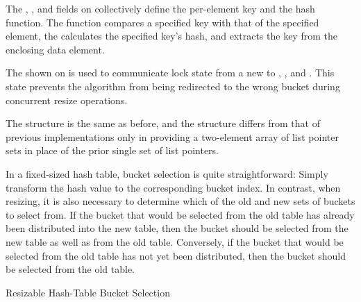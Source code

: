 \begin{fcvref}
The , , and  fields on
collectively define the per-element key and the hash function.
The  function compares a specified key with that of
the specified element,
the  calculates the specified key's hash,
and  extracts the key from the enclosing data
element.

The  shown on 
is used to communicate lock state from a new 
to , , and .
This state prevents the algorithm from being redirected to the wrong
bucket during concurrent resize operations.

The  structure is the same as before, and the
 structure differs from that of previous implementations
only in providing a two-element array of list pointer sets in place of
the prior single set of list pointers.

In a fixed-sized hash table, bucket selection is quite straightforward:
Simply transform the hash value to the corresponding bucket index.
In contrast, when resizing, it is also necessary to determine which
of the old and new sets of buckets to select from.
If the bucket that would be selected from the old table has already
been distributed into the new table, then the bucket should be selected
from the new table as well as from the old table.
Conversely, if the bucket that would be selected from the old table
has not yet been distributed, then the bucket should be selected from
the old table.
\end{fcvref}

\begin{listing}[tb]

\caption{Resizable Hash-Table Bucket Selection}
\label{lst:datastruct:Resizable Hash-Table Bucket Selection}
\end{listing}

